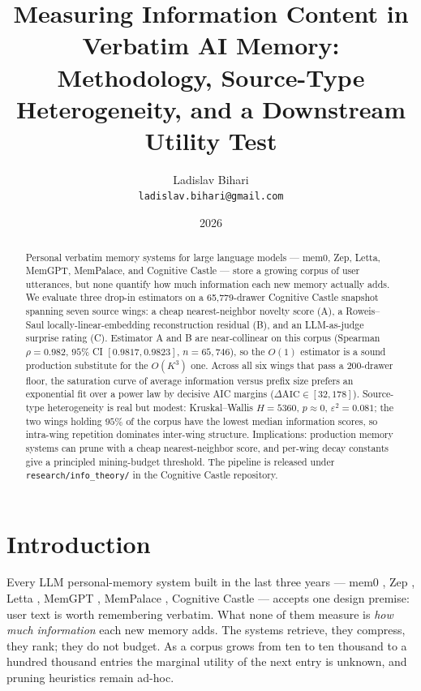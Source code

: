 \documentclass[11pt]{article}
\title{Measuring Information Content in Verbatim AI Memory:\\
  Methodology, Source-Type Heterogeneity, and a Downstream Utility Test}
\author{Ladislav Bihari\\
  \texttt{ladislav.bihari@gmail.com}}
\date{2026}
\begin{document}
\maketitle

\begin{abstract}
Personal verbatim memory systems for large language models --- mem0, Zep, Letta,
MemGPT, MemPalace, and Cognitive Castle --- store a growing corpus of user
utterances, but none quantify how much information each new memory actually
adds. We evaluate three drop-in estimators on a 65,779-drawer Cognitive Castle
snapshot spanning seven source wings: a cheap nearest-neighbor novelty score
(A), a Roweis--Saul locally-linear-embedding reconstruction residual (B), and an
LLM-as-judge surprise rating (C). Estimator A and B are near-collinear on this
corpus (Spearman $\rho = 0.982$, $95\%$ CI $[0.9817, 0.9823]$, $n = 65{,}746$),
so the $O(1)$ estimator is a sound production substitute for the $O(K^3)$ one.
Across all six wings that pass a 200-drawer floor, the saturation curve of
average information versus prefix size prefers an exponential fit over a power
law by decisive AIC margins ($\Delta \mathrm{AIC} \in [32, 178]$). Source-type
heterogeneity is real but modest: Kruskal--Wallis $H = 5360$, $p \approx 0$,
$\varepsilon^2 = 0.081$; the two wings holding $95\%$ of the corpus have the
lowest median information scores, so intra-wing repetition dominates
inter-wing structure. Implications: production memory systems can prune with a
cheap nearest-neighbor score, and per-wing decay constants give a principled
mining-budget threshold. The pipeline is released under
\texttt{research/info\_theory/} in the Cognitive Castle repository.
\end{abstract}

\section{Introduction}

Every LLM personal-memory system built in the last three years --- mem0
\citep{mem0site}, Zep \citep{zepsite}, Letta \citep{lettasite}, MemGPT
\citep{memgpt}, MemPalace \citep{mempalace}, Cognitive Castle
\citep{cognitivecastle} --- accepts one design premise: user text is
worth remembering verbatim. What none of them measure is \emph{how much
information} each new memory adds. The systems retrieve, they compress,
they rank; they do not budget. As a corpus grows from ten to ten thousand
to a hundred thousand entries the marginal utility of the next entry is
unknown, and pruning heuristics remain ad-hoc.
\end{document}
